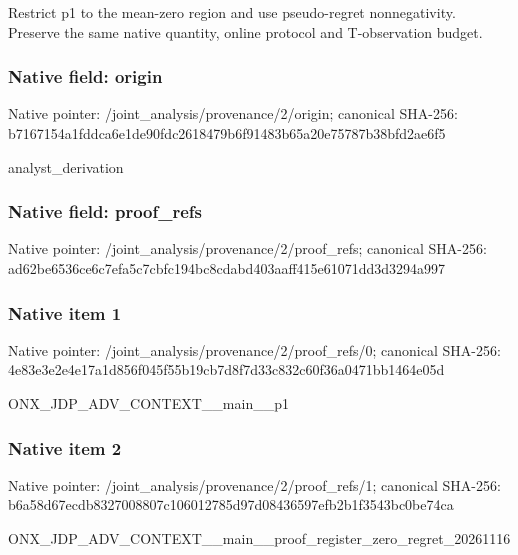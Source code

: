 \documentclass[10pt,a4paper]{article}
\begin{document}
\begingroup\raggedright\sloppy Restrict p1 to the mean-zero region and use pseudo-regret nonnegativity. Preserve the same native quantity,\allowbreak{} online protocol and T-observation budget.\par\endgroup

\subsubsection{Native field: origin}
Native pointer: /joint\_\allowbreak{}analysis/provenance/2/origin; canonical SHA-256: b7167154a1fddca6e1de90fdc2618479b6f91483b65a20e75787b38bfd2ae6f5

\begingroup\raggedright\sloppy analyst\_\allowbreak{}derivation\par\endgroup

\subsubsection{Native field: proof\_\allowbreak{}refs}
Native pointer: /joint\_\allowbreak{}analysis/provenance/2/proof\_\allowbreak{}refs; canonical SHA-256: ad62be6536ce6c7efa5c7cbfc194bc8cdabd403aaff415e61071dd3d3294a997

\subsubsection{Native item 1}
Native pointer: /joint\_\allowbreak{}analysis/provenance/2/proof\_\allowbreak{}refs/0; canonical SHA-256: 4e83e3e2e4e17a1d856f045f55b19cb7d8f7d33c832c60f36a0471bb1464e05d

\begingroup\raggedright\sloppy ONX\_\allowbreak{}JDP\_\allowbreak{}ADV\_\allowbreak{}CONTEXT\_\allowbreak{}\_\allowbreak{}main\_\allowbreak{}\_\allowbreak{}p1\par\endgroup

\subsubsection{Native item 2}
Native pointer: /joint\_\allowbreak{}analysis/provenance/2/proof\_\allowbreak{}refs/1; canonical SHA-256: b6a58d67ecdb8327008807c106012785d97d08436597efb2b1f3543bc0be74ca

\begingroup\raggedright\sloppy ONX\_\allowbreak{}JDP\_\allowbreak{}ADV\_\allowbreak{}CONTEXT\_\allowbreak{}\_\allowbreak{}main\_\allowbreak{}\_\allowbreak{}proof\_\allowbreak{}register\_\allowbreak{}zero\_\allowbreak{}regret\_\allowbreak{}20261116\par\endgroup
\end{document}
